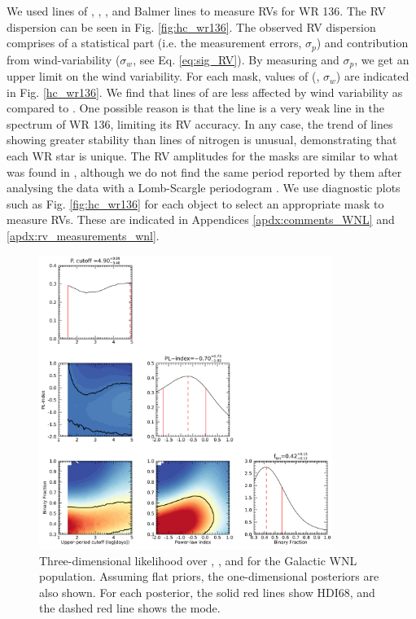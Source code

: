 We used lines of \heii{}, \niii{}, \niv{}, \nv{} and Balmer lines to measure RVs for WR 136. The RV dispersion can be seen in Fig. \ref{fig:hc_wr136}. The observed RV dispersion comprises of a statistical part (i.e. the measurement errors, $\sigma_p$) and contribution from wind-variability ($\sigma_w$, see Eq. \ref{eq:sig_RV}). By measuring \sigRV{} and $\sigma_p$, we get an upper limit on the wind variability. For each mask, values of (\sigRV{}, $\sigma_w$) are indicated in Fig. \ref{hc_wr136}. We find that lines of \heii{} are less affected by wind variability as compared to \NVred{}. One possible reason is that the \NVred{} line is a very weak line in the spectrum of WR 136, limiting its RV accuracy. In any case, the trend of \heii{} lines showing greater stability than lines of nitrogen is unusual, demonstrating that each WR star is unique. The RV amplitudes for the masks are similar to what was found in \citet{koenigsberger_spectral_1980}, although we do not find the same period reported by them after analysing the data with a Lomb-Scargle periodogram \citep{lomb_least-squares_1976,scargle_studies_1982}. We use diagnostic plots such as Fig. \ref{fig:hc_wr136} for each object to select an appropriate mask to measure RVs. These are indicated in Appendices \ref{apdx:comments_WNL} and \ref{apdx:rv_measurements_wnl}.
\begin{figure}[ht]
    \centering
    \includegraphics[width=0.85\textwidth]{chapters/WNL/image/WNL_May18_4RVbins_stat9.png}
    \caption{Three-dimensional likelihood over \logPmaxWNL{}, \fintWNL{}, and \piWNL{} for the Galactic WNL population. Assuming flat priors, the one-dimensional posteriors are also shown. For each posterior, the solid red lines show HDI68, and the dashed red line shows the mode.}
    \label{fig:posteriors_WNL}
\end{figure}


